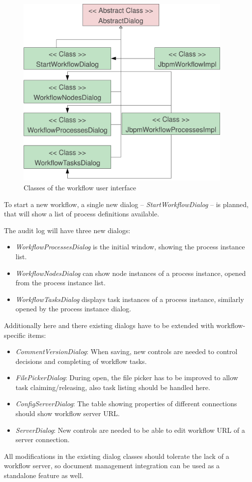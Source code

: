 \begin{figure}[p]
\centering
\includegraphics[width=400px,keepaspectratio]{design-wfui.pdf}
\caption{Classes of the workflow user interface}
\label{fig:design-wfui}
\end{figure}

To start a new workflow, a single new dialog -- \emph{StartWorkflowDialog} --
is planned, that will show a list of process definitions available.

The audit log will have three new dialogs:

\begin{itemize}
\item \emph{WorkflowProcessesDialog} is the initial window, showing the process instance list.
\item \emph{WorkflowNodesDialog} can show node instances of a process instance, opened from the process instance list.
\item \emph{WorkflowTasksDialog} displays task instances of a process instance, similarly opened by the process instance dialog.
\end{itemize}

Additionally here and there existing dialogs have to be extended with
workflow-specific items:

\begin{itemize}
\item \emph{CommentVersionDialog}: When saving, new controls are needed to control decisions and completing of workflow tasks.
\item \emph{FilePickerDialog}: During open, the file picker has to be improved to allow task claiming/releasing, also task listing should be handled here.
\item \emph{ConfigServerDialog}: The table showing properties of different connections should show workflow server URL.
\item \emph{ServerDialog}: New controls are needed to be able to edit workflow URL of a server connection.
\end{itemize}

All modifications in the existing dialog classes should tolerate the lack of a
workflow server, so document management integration can be used as a standalone
feature as well.
